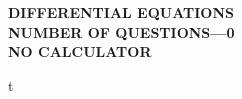 \documentclass[letterstyle,12pt]{extarticle}
\newcounter{qcounter}
\newcommand{\ques}[1]{\begin{minipage}{0.9 \textwidth} \item #1 \end{minipage} \vspace{4ex}}
\begin{document}
\begin{center}
    {\bf
    \MakeUppercase{Differential Equations\\[1ex]
    NUMBER OF QUESTIONS—0 \\[1ex] 
    NO CALCULATOR \\[5ex]
    }}
\end{center}

\begin{list}{\textbf{.}~}{}
\setlength\itemsep{3em}

\ques{
t
}

\end{list}

\clearpage 

\twocolumn

\begin{supertabular}{ll}

\end{supertabular}
\end{document}
